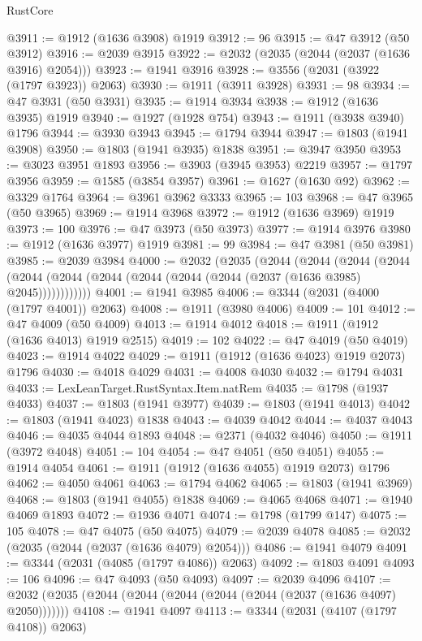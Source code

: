 \begin{lexlean}{RustCore}
\begin{coremodule}
@3911 := @1912 (@1636 @3908) @1919
@3912 := 96
@3915 := @47 @3912 (@50 @3912)
@3916 := @2039 @3915
@3922 := @2032 (@2035 (@2044 (@2037 (@1636 @3916) @2054)))
@3923 := @1941 @3916
@3928 := @3556 (@2031 (@3922 (@1797 @3923)) @2063)
@3930 := @1911 (@3911 @3928)
@3931 := 98
@3934 := @47 @3931 (@50 @3931)
@3935 := @1914 @3934
@3938 := @1912 (@1636 @3935) @1919
@3940 := @1927 (@1928 @754)
@3943 := @1911 (@3938 @3940) @1796
@3944 := @3930 @3943
@3945 := @1794 @3944
@3947 := @1803 (@1941 @3908)
@3950 := @1803 (@1941 @3935) @1838
@3951 := @3947 @3950
@3953 := @3023 @3951 @1893
@3956 := @3903 (@3945 @3953) @2219
@3957 := @1797 @3956
@3959 := @1585 (@3854 @3957)
@3961 := @1627 (@1630 @92)
@3962 := @3329 @1764
@3964 := @3961 @3962 @3333
@3965 := 103
@3968 := @47 @3965 (@50 @3965)
@3969 := @1914 @3968
@3972 := @1912 (@1636 @3969) @1919
@3973 := 100
@3976 := @47 @3973 (@50 @3973)
@3977 := @1914 @3976
@3980 := @1912 (@1636 @3977) @1919
@3981 := 99
@3984 := @47 @3981 (@50 @3981)
@3985 := @2039 @3984
@4000 := @2032
    (@2035
      (@2044
        (@2044
          (@2044
            (@2044 (@2044 (@2044 (@2044 (@2044 (@2044 (@2044 (@2037 (@1636 @3985) @2045))))))))))))
@4001 := @1941 @3985
@4006 := @3344 (@2031 (@4000 (@1797 @4001)) @2063)
@4008 := @1911 (@3980 @4006)
@4009 := 101
@4012 := @47 @4009 (@50 @4009)
@4013 := @1914 @4012
@4018 := @1911 (@1912 (@1636 @4013) @1919 @2515)
@4019 := 102
@4022 := @47 @4019 (@50 @4019)
@4023 := @1914 @4022
@4029 := @1911 (@1912 (@1636 @4023) @1919 @2073) @1796
@4030 := @4018 @4029
@4031 := @4008 @4030
@4032 := @1794 @4031
@4033 := LexLeanTarget.RustSyntax.Item.natRem
@4035 := @1798 (@1937 @4033)
@4037 := @1803 (@1941 @3977)
@4039 := @1803 (@1941 @4013)
@4042 := @1803 (@1941 @4023) @1838
@4043 := @4039 @4042
@4044 := @4037 @4043
@4046 := @4035 @4044 @1893
@4048 := @2371 (@4032 @4046)
@4050 := @1911 (@3972 @4048)
@4051 := 104
@4054 := @47 @4051 (@50 @4051)
@4055 := @1914 @4054
@4061 := @1911 (@1912 (@1636 @4055) @1919 @2073) @1796
@4062 := @4050 @4061
@4063 := @1794 @4062
@4065 := @1803 (@1941 @3969)
@4068 := @1803 (@1941 @4055) @1838
@4069 := @4065 @4068
@4071 := @1940 @4069 @1893
@4072 := @1936 @4071
@4074 := @1798 (@1799 @147)
@4075 := 105
@4078 := @47 @4075 (@50 @4075)
@4079 := @2039 @4078
@4085 := @2032 (@2035 (@2044 (@2037 (@1636 @4079) @2054)))
@4086 := @1941 @4079
@4091 := @3344 (@2031 (@4085 (@1797 @4086)) @2063)
@4092 := @1803 @4091
@4093 := 106
@4096 := @47 @4093 (@50 @4093)
@4097 := @2039 @4096
@4107 := @2032 (@2035 (@2044 (@2044 (@2044 (@2044 (@2044 (@2037 (@1636 @4097) @2050)))))))
@4108 := @1941 @4097
@4113 := @3344 (@2031 (@4107 (@1797 @4108)) @2063)

\end{coremodule}
\end{lexlean}
